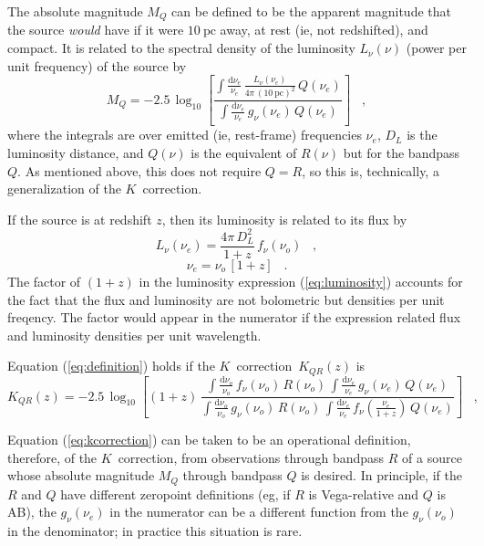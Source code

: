 \documentclass[preprint]{aastex}
\newcommand{\kcorrection}{$K$~correction}
\newcommand{\nuobs}{\nu_o}
\newcommand{\nuemit}{\nu_e}
\begin{document}
The absolute magnitude $M_Q$ can be defined to be the apparent
magnitude that the source \emph{would} have if it were
$10~\mathrm{pc}$ away, at rest (ie, not redshifted), and compact.  It
is related to the spectral density of the luminosity $L_{\nu}(\nu)$
(power per unit frequency) of the source by
\begin{equation}
M_Q = -2.5\,\log_{10}\left[
  \frac{\displaystyle
          \int\frac{\mathrm{d}\nuemit}{\nuemit}\,
              \frac{L_{\nu}(\nuemit)}{4\pi\,(10~\mathrm{pc})^2}\,Q(\nuemit)}
       {\displaystyle
          \int\frac{\mathrm{d}\nuemit}{\nuemit}\,g_{\nu}(\nuemit)\,Q(\nuemit)}
\right] \;\;\;,
\end{equation}
where the integrals are over emitted (ie, rest-frame) frequencies
$\nuemit$, $D_L$ is the luminosity distance, and $Q(\nu)$ is the
equivalent of $R(\nu)$ but for the bandpass $Q$.  As mentioned above,
this does not require $Q=R$, so this is, technically, a generalization
of the \kcorrection.

If the source is at redshift $z$, then its luminosity is related to
its flux by
\begin{equation}
\label{eq:luminosity}
L_{\nu}(\nuemit) = \frac{4\pi\,D_L^2}{1+z}\,f_{\nu}(\nuobs) \;\;\;,
\end{equation}
\begin{equation}
\nuemit = \nuobs\,[1+z] \;\;\;.
\end{equation}
The factor of $(1+z)$ in the luminosity expression
(\ref{eq:luminosity}) accounts for the fact that the flux and
luminosity are not bolometric but densities per unit freqency.  The
factor would appear in the numerator if the expression related flux
and luminosity densities per unit wavelength.

Equation (\ref{eq:definition}) holds if the \kcorrection\ $K_{QR}(z)$
is
\begin{equation}
\label{eq:kcorrection}
K_{QR}(z) = -2.5\,\log_{10}\left[(1+z)\,
  \frac{\displaystyle
          \int\frac{\mathrm{d}\nuobs}{\nuobs}\,f_{\nu}(\nuobs)\,R(\nuobs)\,
          \int\frac{\mathrm{d}\nuemit}{\nuemit}\,g_{\nu}(\nuemit)\,Q(\nuemit)}
       {\displaystyle
          \int\frac{\mathrm{d}\nuobs}{\nuobs}\,g_{\nu}(\nuobs)\,R(\nuobs)\,
          \int\frac{\mathrm{d}\nuemit}{\nuemit}\,
            f_{\nu}\left(\frac{\nuemit}{1+z}\right)\,Q(\nuemit)}
\right] \;\;\;,
\end{equation}

Equation (\ref{eq:kcorrection}) can be taken to be an operational
definition, therefore, of the \kcorrection, from observations through
bandpass $R$ of a source whose absolute magnitude $M_Q$ through
bandpass $Q$ is desired.  In principle, if the $R$ and $Q$ have
different zeropoint definitions (eg, if $R$ is Vega-relative and $Q$
is AB), the $g_{\nu}(\nuemit)$ in the numerator can be a different
function from the $g_{\nu}(\nuobs)$ in the denominator; in practice
this situation is rare.
\end{document}
